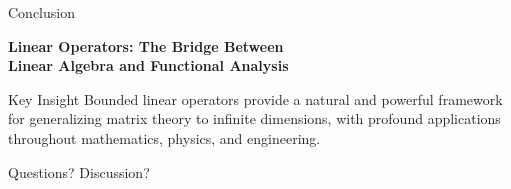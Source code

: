 \documentclass[aspectratio=169,10pt]{beamer}
\begin{document}
\begin{frame}{Conclusion}
    \begin{center}
        {\Large \textbf{Linear Operators: The Bridge Between} \\ \textbf{Linear Algebra and Functional Analysis}}

        \vspace{1cm}

        \begin{block}{Key Insight}
            Bounded linear operators provide a natural and powerful framework for generalizing matrix theory to infinite dimensions, with profound applications throughout mathematics, physics, and engineering.
        \end{block}

        \vspace{1cm}

        {\small Questions? Discussion?}
    \end{center}
\end{frame}
\end{document}
